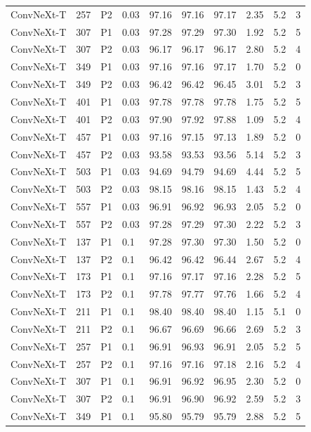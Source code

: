 {\begin{longtable}{lrllrrrrrr}
ConvNeXt-T & 257 & P2 & 0.03 & 97.16 & 97.16 & 97.17 & 2.35 & 5.2 & 3 \\
ConvNeXt-T & 307 & P1 & 0.03 & 97.28 & 97.29 & 97.30 & 1.92 & 5.2 & 5 \\
ConvNeXt-T & 307 & P2 & 0.03 & 96.17 & 96.17 & 96.17 & 2.80 & 5.2 & 4 \\
ConvNeXt-T & 349 & P1 & 0.03 & 97.16 & 97.16 & 97.17 & 1.70 & 5.2 & 0 \\
ConvNeXt-T & 349 & P2 & 0.03 & 96.42 & 96.42 & 96.45 & 3.01 & 5.2 & 3 \\
ConvNeXt-T & 401 & P1 & 0.03 & 97.78 & 97.78 & 97.78 & 1.75 & 5.2 & 5 \\
ConvNeXt-T & 401 & P2 & 0.03 & 97.90 & 97.92 & 97.88 & 1.09 & 5.2 & 4 \\
ConvNeXt-T & 457 & P1 & 0.03 & 97.16 & 97.15 & 97.13 & 1.89 & 5.2 & 0 \\
ConvNeXt-T & 457 & P2 & 0.03 & 93.58 & 93.53 & 93.56 & 5.14 & 5.2 & 3 \\
ConvNeXt-T & 503 & P1 & 0.03 & 94.69 & 94.79 & 94.69 & 4.44 & 5.2 & 5 \\
ConvNeXt-T & 503 & P2 & 0.03 & 98.15 & 98.16 & 98.15 & 1.43 & 5.2 & 4 \\
ConvNeXt-T & 557 & P1 & 0.03 & 96.91 & 96.92 & 96.93 & 2.05 & 5.2 & 0 \\
ConvNeXt-T & 557 & P2 & 0.03 & 97.28 & 97.29 & 97.30 & 2.22 & 5.2 & 3 \\
ConvNeXt-T & 137 & P1 & 0.1 & 97.28 & 97.30 & 97.30 & 1.50 & 5.2 & 0 \\
ConvNeXt-T & 137 & P2 & 0.1 & 96.42 & 96.42 & 96.44 & 2.67 & 5.2 & 4 \\
ConvNeXt-T & 173 & P1 & 0.1 & 97.16 & 97.17 & 97.16 & 2.28 & 5.2 & 5 \\
ConvNeXt-T & 173 & P2 & 0.1 & 97.78 & 97.77 & 97.76 & 1.66 & 5.2 & 4 \\
ConvNeXt-T & 211 & P1 & 0.1 & 98.40 & 98.40 & 98.40 & 1.15 & 5.1 & 0 \\
ConvNeXt-T & 211 & P2 & 0.1 & 96.67 & 96.69 & 96.66 & 2.69 & 5.2 & 3 \\
ConvNeXt-T & 257 & P1 & 0.1 & 96.91 & 96.93 & 96.91 & 2.05 & 5.2 & 5 \\
ConvNeXt-T & 257 & P2 & 0.1 & 97.16 & 97.16 & 97.18 & 2.16 & 5.2 & 4 \\
ConvNeXt-T & 307 & P1 & 0.1 & 96.91 & 96.92 & 96.95 & 2.30 & 5.2 & 0 \\
ConvNeXt-T & 307 & P2 & 0.1 & 96.91 & 96.90 & 96.92 & 2.59 & 5.2 & 3 \\
ConvNeXt-T & 349 & P1 & 0.1 & 95.80 & 95.79 & 95.79 & 2.88 & 5.2 & 5 \\

\end{longtable}}
